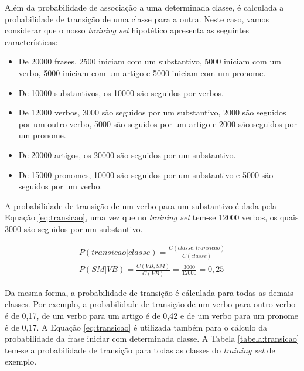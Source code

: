 Além da probabilidade de associação a uma determinada classe, é calculada a
probabilidade de transição de uma classe para a outra. Neste caso, vamos
considerar que o nosso \textit{training set} hipotético apresenta as seguintes
características:

\begin{itemize}
  \item De 20000 frases, 2500 iniciam com um substantivo, 5000 iniciam com um
  verbo, 5000 iniciam com um artigo e 5000 iniciam com um pronome.
  \item De 10000 substantivos, os 10000
  são seguidos por verbos.
  \item De 12000 verbos, 3000 são seguidos por um substantivo, 2000
  são seguidos por um outro verbo, 5000 são seguidos por um artigo e 2000 são
  seguidos por um pronome.
  \item De 20000 artigos, os 20000 são seguidos por um substantivo.
  \item De 15000 pronomes, 10000 são seguidos por um substantivo e 5000 são
  seguidos por um verbo.
  
  
\end{itemize}

A probabilidade de transição de um verbo para um substantivo é dada
pela Equação \ref{eq:transicao}, uma vez que no \textit{training set} tem-se
12000 verbos, os quais 3000 são seguidos por um substantivo.

\begin{equation}
\begin{split}
P(transicao|classe) = \frac{C(classe,transicao)}{C(classe)} \\
P(SM|VB) = \frac{C(VB,SM)}{C(VB)} = \frac{3000}{12000} = 0,25
\end{split}
\label{eq:transicao}
\end{equation}

Da mesma forma, a probabilidade de transição é cálculada para todas as
demais classes. Por exemplo, a probabilidade de
transição de um verbo para outro verbo é de 0,17, de um verbo para um artigo é
de 0,42 e de um verbo para um pronome é de 0,17. A Equação
\ref{eq:transicao} é utilizada também para o cálculo da probabilidade da frase
iniciar com determinada classe.
A Tabela \ref{tabela:transicao} tem-se a probabilidade de transição para todas
as classes do \textit{training set} de exemplo.

